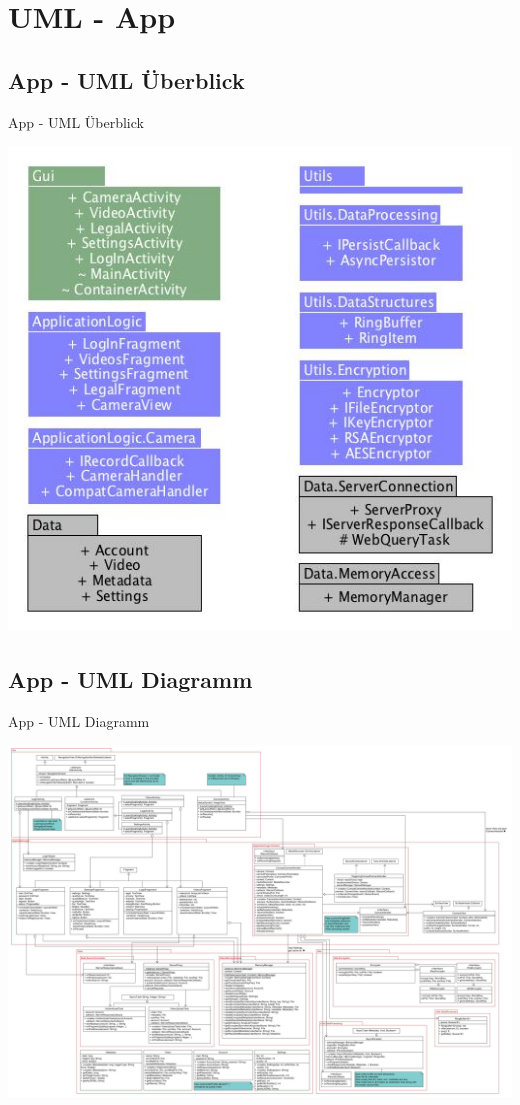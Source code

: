 \documentclass[19pt]{beamer}
\begin{document}
\section{UML - App}
\subsection{App - UML \"{U}berblick}
\begin{frame}{App - UML \"{U}berblick}
\begin{center}
\includegraphics[scale=0.4]{resources/modules_overview_app.jpg}
\end{center}
\end{frame}
\subsection{App - UML Diagramm}
\begin{frame}{App - UML Diagramm}
\begin{center}
\includegraphics[scale=0.093]{resources/UMLAndroidApp.jpg}
\end{center}
\end{frame}
\end{document}
